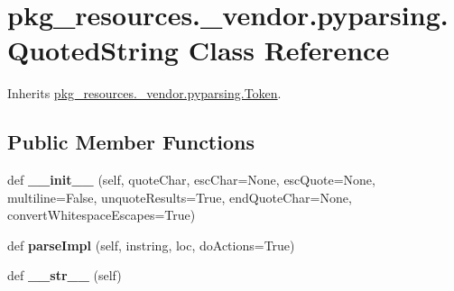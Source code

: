 \hypertarget{classpkg__resources_1_1__vendor_1_1pyparsing_1_1_quoted_string}{}\section{pkg\+\_\+resources.\+\_\+vendor.\+pyparsing.\+Quoted\+String Class Reference}
\label{classpkg__resources_1_1__vendor_1_1pyparsing_1_1_quoted_string}


Inherits \hyperlink{classpkg__resources_1_1__vendor_1_1pyparsing_1_1_token}{pkg\+\_\+resources.\+\_\+vendor.\+pyparsing.\+Token}.

\subsection*{Public Member Functions}
\begin{DoxyCompactItemize}
\item 
\mbox{\label{classpkg__resources_1_1__vendor_1_1pyparsing_1_1_quoted_string_a054ca15d9853c22d1028d13a7208b4be}} 
def {\bfseries \+\_\+\+\_\+init\+\_\+\+\_\+} (self, quote\+Char, esc\+Char=None, esc\+Quote=None, multiline=False, unquote\+Results=True, end\+Quote\+Char=None, convert\+Whitespace\+Escapes=True)
\item 
\mbox{\label{classpkg__resources_1_1__vendor_1_1pyparsing_1_1_quoted_string_ae03a1fe1d89a69ff5972dc9ab2151968}} 
def {\bfseries parse\+Impl} (self, instring, loc, do\+Actions=True)
\item 
\mbox{\label{classpkg__resources_1_1__vendor_1_1pyparsing_1_1_quoted_string_a7038e3b8ae9396644d53db914902dbda}} 
def {\bfseries \+\_\+\+\_\+str\+\_\+\+\_\+} (self)
\end{DoxyCompactItemize}
